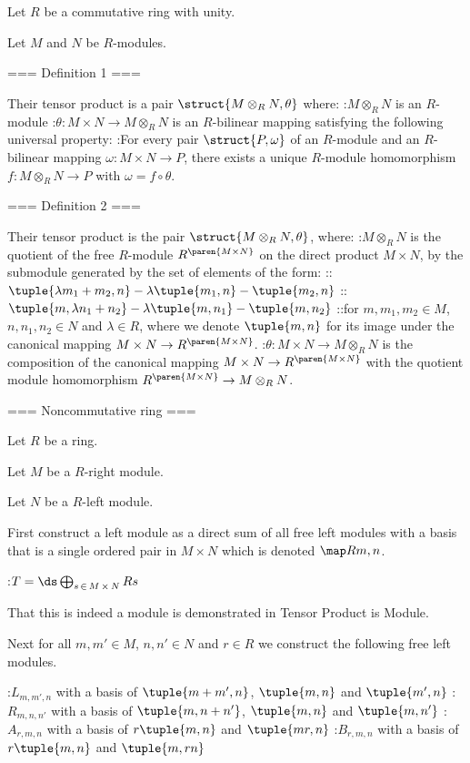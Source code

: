 Let $R$ be a commutative ring with unity.

Let $M$ and $N$ be $R$-modules.


=== Definition 1 ===

Their tensor product is a pair $\struct {M \otimes_R N, \theta}$ where:
:$M \otimes_R N$ is an $R$-module
:$\theta : M \times N \to M \otimes_R N$ is an $R$-bilinear mapping
satisfying the following universal property:
:For every pair $\struct {P, \omega}$ of an $R$-module and an $R$-bilinear mapping $\omega : M \times N \to P$, there exists a unique $R$-module homomorphism $f: M \otimes_R N \to P$ with $\omega = f \circ \theta$.


=== Definition 2 ===

Their tensor product is the pair $\struct {M \otimes_R N, \theta}$, where:
:$M \otimes_R N$ is the quotient of the free $R$-module $R^{\paren {M \times N} }$ on the direct product $M \times N$, by the submodule generated by the set of elements of the form:
::$\tuple {\lambda m_1 + m_2, n} - \lambda \tuple {m_1, n} - \tuple {m_2, n}$
::$\tuple {m, \lambda n_1 + n_2} - \lambda \tuple {m, n_1} - \tuple {m, n_2}$
::for $m, m_1, m_2 \in M$, $n, n_1, n_2 \in N$ and $\lambda \in R$, where we denote $\tuple {m, n}$ for its image under the canonical mapping $M \times N \to R^{\paren {M \times N} }$.
:$\theta : M \times N \to M \otimes_R N$ is the composition of the canonical mapping $M \times N \to R^{\paren {M \times N} }$ with the quotient module homomorphism $R^{\paren {M \times N} } \to M \otimes_R N$.


=== Noncommutative ring ===

Let $R$ be a ring.

Let $M$ be a $R$-right module.

Let $N$ be a $R$-left module.


First construct a left module as a direct sum of all free left modules with a basis that is a single ordered pair in $M \times N$ which is denoted $\map R {m, n}$.

:$T = \ds \bigoplus_{s \mathop \in M \mathop \times N} R s$


That this is indeed a module is demonstrated in Tensor Product is Module.


Next for all $m, m' \in M$, $n, n' \in N$ and $r \in R$ we construct the following free left modules.

:$L_{m, m', n}$ with a basis of $\tuple {m + m', n}$, $\tuple {m, n}$ and $\tuple {m', n}$
:$R_{m, n, n'}$ with a basis of $\tuple {m, n + n'}$, $\tuple {m, n}$ and $\tuple {m, n'}$
:$A_{r, m, n}$ with a basis of $r \tuple {m, n}$ and $\tuple {m r, n}$
:$B_{r, m, n}$ with a basis of $r \tuple {m, n}$ and $\tuple {m, r n}$

